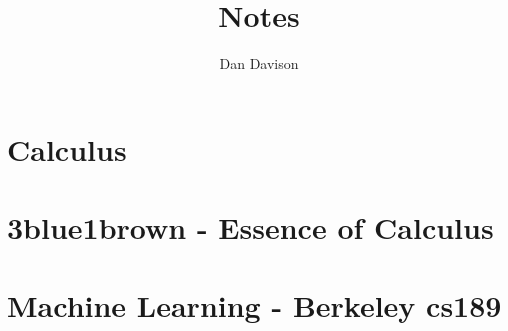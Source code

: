 \documentclass{book}
\title{Notes}
\author{Dan Davison}
\begin{document}
\frontmatter
\maketitle
\tableofcontents
\mainmatter
\chapter{Calculus}


\chapter{3blue1brown - Essence of Calculus}


\chapter{Machine Learning - Berkeley cs189}

\end{document}
